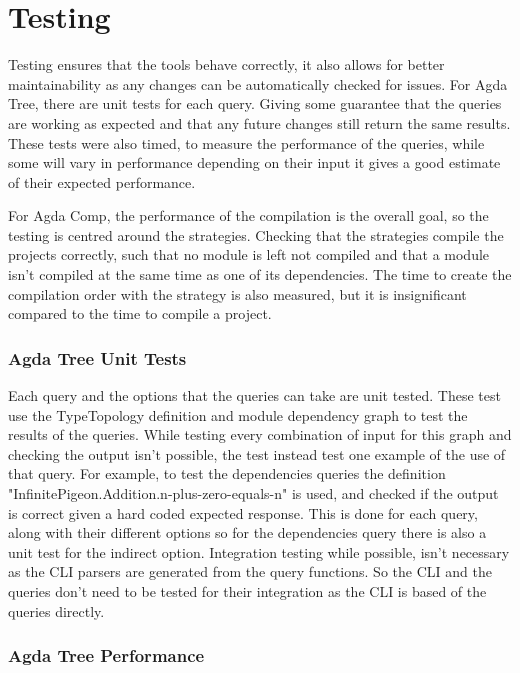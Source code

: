 
\chapter{Testing}

Testing ensures that the tools behave correctly, it also allows for better
maintainability as any changes can be automatically checked for issues. For
Agda Tree, there are unit tests for each query. Giving some guarantee that the
queries are working as expected and that any future changes still return the
same results. These tests were also timed, to measure the performance of the
queries, while some will vary in performance depending on their input it gives
a good estimate of their expected performance.

For Agda Comp, the performance of the compilation is the overall goal, so the
testing is centred around the strategies. Checking that the strategies compile
the projects correctly, such that no module is left not compiled and that a
module isn't compiled at the same time as one of its dependencies. The time to
create the compilation order with the strategy is also measured, but it is
insignificant compared to the time to compile a project.

\subsection{Agda Tree Unit Tests}

Each query and the options that the queries can take are unit tested. These
test use the TypeTopology definition and module dependency graph to test the
results of the queries. While testing every combination of input for this graph
and checking the output isn't possible, the test instead test one example of
the use of that query. For example, to test the dependencies queries the
definition "InfinitePigeon.Addition.n-plus-zero-equals-n" is used, and checked
if the output is correct given a hard coded expected response. This is done for
each query, along with their different options so for the dependencies query
there is also a unit test for the indirect option. Integration testing while
possible, isn't necessary as the CLI parsers are generated from the query
functions. So the CLI and the queries don't need to be tested for their
integration as the CLI is based of the queries directly. 

\subsection{Agda Tree Performance} \label{sub:agda tree performance}

